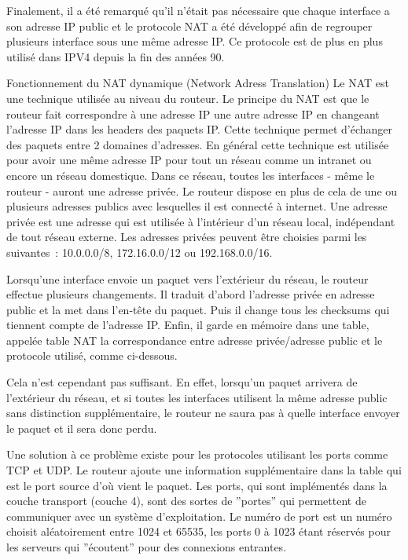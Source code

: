 Finalement, il a été remarqué qu'il n'était pas nécessaire que chaque interface
a son adresse IP public et le protocole NAT a été développé afin de regrouper
plusieurs interface sous une même adresse IP. Ce protocole est de plus en plus
utilisé dans IPV4 depuis la fin des années 90.


Fonctionnement du NAT dynamique (Network Adress Translation)
Le NAT est une technique utilisée au niveau du routeur. Le principe du NAT est
que le routeur fait correspondre à une adresse IP une autre adresse IP en
changeant l'adresse IP dans les headers des paquets IP. Cette technique permet
d'échanger des paquets entre 2 domaines d'adresses. En général cette technique
est utilisée pour avoir une même adresse IP pour tout un réseau comme un 
intranet ou encore un réseau domestique. Dans ce réseau, toutes les interfaces
- même le routeur - auront une adresse privée. Le routeur dispose en plus de
cela de une ou plusieurs adresses publics avec lesquelles il est connecté à
internet. Une adresse privée est une adresse qui est utilisée à l'intérieur
d'un réseau local, indépendant de tout réseau externe. Les adresses privées
peuvent être choisies parmi les suivantes : 10.0.0.0/8, 172.16.0.0/12 ou
192.168.0.0/16.

Lorsqu'une interface envoie un paquet vers l'extérieur du réseau, le routeur
effectue plusieurs changements. Il traduit d'abord l'adresse privée en adresse
public et la met dans l'en-tête du paquet. Puis il change tous les checksums
qui tiennent compte de l'adresse IP. Enfin, il garde en mémoire dans une table,
 appelée table NAT la correspondance entre adresse privée/adresse public et le
protocole utilisé, comme ci-dessous.

Cela n'est cependant pas suffisant. En effet, lorsqu'un paquet arrivera de
l'extérieur du réseau,  et si toutes les interfaces utilisent la même adresse
public sans distinction supplémentaire, le routeur ne saura pas à quelle
interface envoyer le paquet et il sera donc perdu.

Une solution à ce problème existe pour les protocoles utilisant les ports comme
TCP et UDP. Le routeur ajoute une information supplémentaire dans la table qui
est le port source d'où vient le paquet. Les ports, qui sont implémentés dans
la couche transport (couche 4), sont des sortes de ''portes'' qui permettent de
communiquer avec un système d'exploitation. Le numéro de port est un numéro
choisit aléatoirement entre 1024 et 65535, les ports 0 à 1023 étant réservés
pour les serveurs qui ''écoutent'' pour des connexions entrantes.

